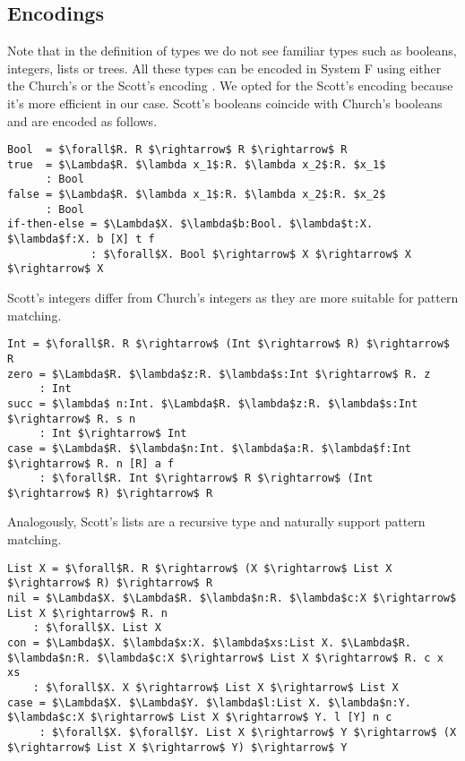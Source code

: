   
  \subsection{Encodings}
Note that in the definition of types we do not see familiar types such as booleans, integers, lists or trees. All these types can be encoded in System F using either the Church's or the Scott's encoding \cite{ScottNumerals}. We opted for the Scott's encoding because it's more efficient in our case.
Scott's booleans coincide with Church's booleans and are encoded as follows.
\begin{lstlisting}[style=plain, mathescape]
Bool  = $\forall$R. R $\rightarrow$ R $\rightarrow$ R
true  = $\Lambda$R. $\lambda x_1$:R. $\lambda x_2$:R. $x_1$
      : Bool
false = $\Lambda$R. $\lambda x_1$:R. $\lambda x_2$:R. $x_2$
      : Bool
if-then-else = $\Lambda$X. $\lambda$b:Bool. $\lambda$t:X. $\lambda$f:X. b [X] t f
             : $\forall$X. Bool $\rightarrow$ X $\rightarrow$ X $\rightarrow$ X
\end{lstlisting}

Scott's integers differ from Church's integers as they are more suitable for pattern matching. 
\begin{lstlisting}[style=plain, mathescape]
Int = $\forall$R. R $\rightarrow$ (Int $\rightarrow$ R) $\rightarrow$ R
zero = $\Lambda$R. $\lambda$z:R. $\lambda$s:Int $\rightarrow$ R. z
     : Int
succ = $\lambda$ n:Int. $\Lambda$R. $\lambda$z:R. $\lambda$s:Int $\rightarrow$ R. s n
     : Int $\rightarrow$ Int
case = $\Lambda$R. $\lambda$n:Int. $\lambda$a:R. $\lambda$f:Int $\rightarrow$ R. n [R] a f
     : $\forall$R. Int $\rightarrow$ R $\rightarrow$ (Int $\rightarrow$ R) $\rightarrow$ R
\end{lstlisting}

Analogously, Scott's lists are a recursive type and naturally support pattern matching.
\begin{lstlisting}[style=plain, mathescape]
List X = $\forall$R. R $\rightarrow$ (X $\rightarrow$ List X $\rightarrow$ R) $\rightarrow$ R
nil = $\Lambda$X. $\Lambda$R. $\lambda$n:R. $\lambda$c:X $\rightarrow$ List X $\rightarrow$ R. n
    : $\forall$X. List X
con = $\Lambda$X. $\lambda$x:X. $\lambda$xs:List X. $\Lambda$R. $\lambda$n:R. $\lambda$c:X $\rightarrow$ List X $\rightarrow$ R. c x xs
    : $\forall$X. X $\rightarrow$ List X $\rightarrow$ List X
case = $\Lambda$X. $\Lambda$Y. $\lambda$l:List X. $\lambda$n:Y. $\lambda$c:X $\rightarrow$ List X $\rightarrow$ Y. l [Y] n c
     : $\forall$X. $\forall$Y. List X $\rightarrow$ Y $\rightarrow$ (X $\rightarrow$ List X $\rightarrow$ Y) $\rightarrow$ Y
\end{lstlisting}


